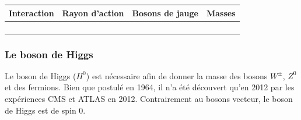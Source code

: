 \smallskip
\begin{table}[h!]
\centering
\begin{tabular}{|P{33mm}|P{26mm}|P{22mm}|P{52mm}|}
\hline 
{}Interaction&Rayon d'action&Bosons de jauge&Masses\\
\hline 
{}&
& 
&
\\
\hline 
{}&
\shortstack{ $\infty$}& 
&
\\
\hline 
{}&
& 
&
\\
\hline 
{}&
\shortstack{$\infty$}& 
&
\\
\hline 
\end{tabular} 
\label{bosons}
\end{table}

\subsubsection{Le boson de Higgs}
Le boson de Higgs ($H^{0}$) est nécessaire afin de donner la masse des bosons $W^{\pm}$, $Z^{0}$ et des fermions. Bien que postulé en 1964, il n'a été découvert qu'en 2012 par les expériences CMS et ATLAS en 2012. Contrairement au bosons vecteur, le boson de Higgs est de spin 0.

